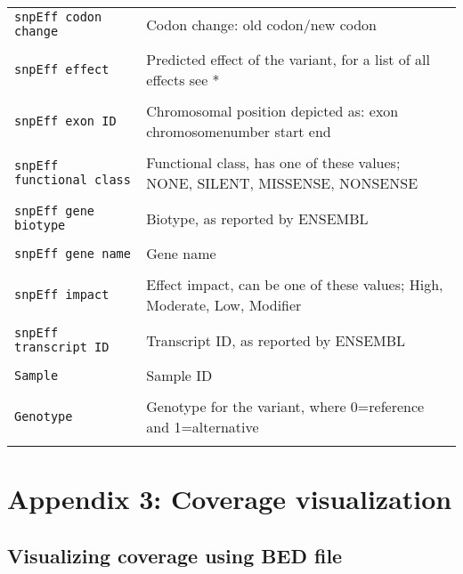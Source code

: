 \documentclass[a4paper,12pt]{article}
\begin{document}
\begin{center}
\begin{longtable}{p{5cm} p{8cm}}
	\tt{snpEff codon change} & Codon change: old codon/new codon \\\\
	\tt{snpEff effect} & Predicted effect of the variant, for a list of all effects see * \\\\
	\tt{snpEff exon ID} & Chromosomal position depicted as: exon chromosomenumber start end \\\\
	\tt{snpEff functional class} & Functional class, has one of these values; NONE, SILENT, MISSENSE, NONSENSE \\\\
	\tt{snpEff gene biotype} & Biotype, as reported by ENSEMBL \\\\
	\tt{snpEff gene name} & Gene name \\\\
	\tt{snpEff impact} & Effect impact, can be one of these values; High, Moderate, Low, Modifier \\\\
	\tt{snpEff transcript ID} & Transcript ID, as reported by ENSEMBL \\\\
	\tt{Sample} & Sample ID \\\\
	\tt{Genotype} & Genotype for the variant, where 0=reference and 1=alternative \\\\	\end{longtable}
\end{center}

\clearpage
\section*{Appendix 3: Coverage visualization}
\subsection*{Visualizing coverage using BED file}
\end{document}
